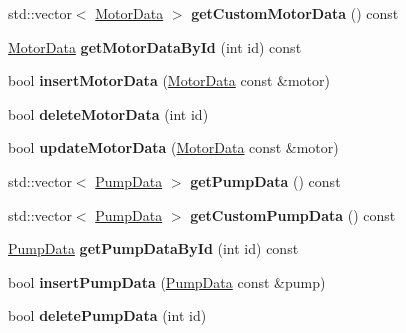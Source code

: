 \begin{DoxyCompactItemize}
\mbox{\label{class_s_q_lite_a0cc4f6952652d05d6a87e2f7cc232d57}} 
std\+::vector$<$ \hyperlink{class_motor_data}{Motor\+Data} $>$ {\bfseries get\+Custom\+Motor\+Data} () const
\item 
\mbox{\label{class_s_q_lite_a4b0a99992e2909216b40dc499c86a028}} 
\hyperlink{class_motor_data}{Motor\+Data} {\bfseries get\+Motor\+Data\+By\+Id} (int id) const
\item 
\mbox{\label{class_s_q_lite_a38eb0f1501e0918c267a9ab3a0953a54}} 
bool {\bfseries insert\+Motor\+Data} (\hyperlink{class_motor_data}{Motor\+Data} const \&motor)
\item 
\mbox{\label{class_s_q_lite_ab1f59cd24e3931970bc39079b0a5e612}} 
bool {\bfseries delete\+Motor\+Data} (int id)
\item 
\mbox{\label{class_s_q_lite_a7909128eed1b0612ecdf7c50edf1426a}} 
bool {\bfseries update\+Motor\+Data} (\hyperlink{class_motor_data}{Motor\+Data} const \&motor)
\item 
\mbox{\label{class_s_q_lite_a5e49f6e1f7a87a06140a2389994a5a33}} 
std\+::vector$<$ \hyperlink{class_pump_data}{Pump\+Data} $>$ {\bfseries get\+Pump\+Data} () const
\item 
\mbox{\label{class_s_q_lite_aa5804e50c869f890a539ef7afbb706eb}} 
std\+::vector$<$ \hyperlink{class_pump_data}{Pump\+Data} $>$ {\bfseries get\+Custom\+Pump\+Data} () const
\item 
\mbox{\label{class_s_q_lite_a3ef7e31ae397704e54802d441ee93ef4}} 
\hyperlink{class_pump_data}{Pump\+Data} {\bfseries get\+Pump\+Data\+By\+Id} (int id) const
\item 
\mbox{\label{class_s_q_lite_a88f4b584c569fbab361b9ee1418117a8}} 
bool {\bfseries insert\+Pump\+Data} (\hyperlink{class_pump_data}{Pump\+Data} const \&pump)
\item 
\mbox{\label{class_s_q_lite_a1efbc9694699b16250b8510791bfc2db}} 
bool {\bfseries delete\+Pump\+Data} (int id)
\item 

\end{DoxyCompactItemize}
